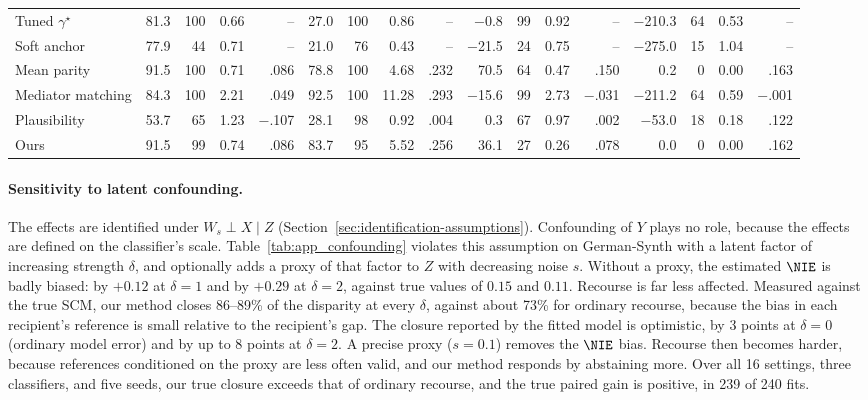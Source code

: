 \begin{table}[t]
\begin{tabular}{lrrrrrrrrrrrrrrrr}
Tuned $\gamma^\star$ & 81.3 & 100 & 0.66 & -- & 27.0 & 100 & 0.86 & -- & $-$0.8 & 99 & 0.92 & -- & $-$210.3 & 64 & 0.53 & -- \\
Soft anchor & 77.9 & 44 & 0.71 & -- & 21.0 & 76 & 0.43 & -- & $-$21.5 & 24 & 0.75 & -- & $-$275.0 & 15 & 1.04 & -- \\
Mean parity & 91.5 & 100 & 0.71 & .086 & 78.8 & 100 & 4.68 & .232 & 70.5 & 64 & 0.47 & .150 & 0.2 & 0 & 0.00 & .163 \\
Mediator matching & 84.3 & 100 & 2.21 & .049 & 92.5 & 100 & 11.28 & .293 & $-$15.6 & 99 & 2.73 & $-$.031 & $-$211.2 & 64 & 0.59 & $-$.001 \\
Plausibility & 53.7 & 65 & 1.23 & $-$.107 & 28.1 & 98 & 0.92 & .004 & 0.3 & 67 & 0.97 & .002 & $-$53.0 & 18 & 0.18 & .122 \\
\hline
Ours & 91.5 & 99 & 0.74 & .086 & 83.7 & 95 & 5.52 & .256 & 36.1 & 27 & 0.26 & .078 & 0.0 & 0 & 0.00 & .162 \\
\hline
\end{tabular}
\end{table}

\paragraph{Sensitivity to latent confounding.}
The effects are identified under $W_s\perp X\mid Z$
(Section~\ref{sec:identification-assumptions}). Confounding of $Y$ plays no
role, because the effects are defined on the classifier's scale.
Table~\ref{tab:app_confounding} violates this assumption on German-Synth with
a latent factor of increasing strength $\delta$, and optionally adds a proxy of
that factor to $Z$ with decreasing noise $s$. Without a proxy, the estimated
$\NIE$ is badly biased: by $+0.12$ at $\delta=1$ and by $+0.29$ at
$\delta=2$, against true values of $0.15$ and $0.11$. Recourse is far less
affected. Measured against the true SCM, our method closes 86--89\% of the
disparity at every $\delta$, against about 73\% for ordinary recourse,
because the bias in each recipient's reference is small relative to the
recipient's gap. The closure reported by the fitted model is optimistic, by
3 points at $\delta=0$ (ordinary model error) and by up to 8 points at
$\delta=2$. A precise proxy ($s=0.1$) removes the $\NIE$ bias. Recourse then
becomes harder, because references conditioned on the proxy are less often
valid, and our method responds by abstaining more. Over all 16 settings, three
classifiers, and five seeds, our true closure exceeds that of ordinary
recourse, and the true paired gain is positive, in 239 of 240 fits.

